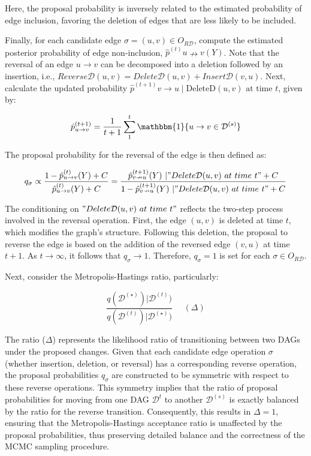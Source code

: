 \documentclass{report}
\begin{document}
Here, the proposal probability is inversely related to the estimated probability of edge inclusion, favoring the deletion of edges that are less likely to be included.

Finally, for each candidate edge $\sigma = (u, v) \in O_{R\mathcal{D}}$, compute the estimated posterior probability of edge non-inclusion, $\hat{p}^{(t)}{u \nrightarrow v}(Y)$. Note that the reversal of an edge $u \rightarrow v$ can be decomposed into a deletion followed by an insertion, i.e., $Reverse\mathcal{D}(u, v) = Delete\mathcal{D}(u, v) + Insert\mathcal{D}(v, u)$. Next, calculate the updated probability $\hat{p}^{(t+1)}{v \rightarrow u} \mid \text{DeleteD}(u, v) \text{ at time } t$, given by:

$$
\hat{p}^{(t+1)}_{u\rightarrow v} = \frac{1}{t+1}\sum_1^{t}\mathbbm{1}\{u \rightarrow v \in \mathcal{D}^{(s)}\}
$$

The proposal probability for the reversal of the edge is then defined as:

\begin{equation} \label{proposal-prob-reverse}
	q_{\sigma} \propto \frac{1-\hat{p}^{(t)}_{u\rightarrow v} (Y )+C}{\hat{p}^{(t)}_{u\rightarrow v} (Y)+C} = \frac{\hat{p}^{(t+1)}_{v\nrightarrow u} (Y ) \ |  "Delete\mathcal{D}(u,v) \ at \ time \ t"+C}{1-\hat{p}^{(t+1)}_{v\nrightarrow u} (Y) \ | "Delete\mathcal{D}(u,v) \ at \ time \ t"+C} 
\end{equation}

The conditioning on $"Delete\mathcal{D}(u,v) \ at \ time \ t"$ reflects the two-step process involved in the reversal operation. First, the edge $(u,v)$ is deleted at time $t$, which modifies the graph's structure. Following this deletion, the proposal to reverse the edge is based on the addition of the reversed edge $(v,u)$ at time $t+1$. 
As $t \rightarrow \infty$, it follows that $q_{\sigma} \rightarrow 1$. Therefore, $q_{\sigma} = 1$ is set for each $\sigma \in O_{R\mathcal{D}}$.

Next, consider the Metropolis-Hastings ratio, particularly: 

$$
\frac{q(\mathcal{D}^{(\star)})|\mathcal{D}^{(t)})}{q(\mathcal{D}^{(t)})|\mathcal{D}^{(\star)})} \ \ \ \ \ \ (\Delta)
$$

The ratio ($\Delta$) represents the likelihood ratio of transitioning between two DAGs under the proposed changes. Given that each candidate edge operation $\sigma$ (whether insertion, deletion, or reversal) has a corresponding reverse operation, the proposal probabilities $q_{\sigma}$
are constructed to be symmetric with respect to these reverse operations. This symmetry implies that the ratio of proposal probabilities for moving from one DAG $\mathcal{D}^t$ to another $\mathcal{D}^{(s)}$
is exactly balanced by the ratio for the reverse transition. Consequently, this results in $\Delta = 1$, ensuring that the Metropolis-Hastings acceptance ratio is unaffected by the proposal probabilities, thus preserving detailed balance and the correctness of the MCMC sampling procedure.
\end{document}
